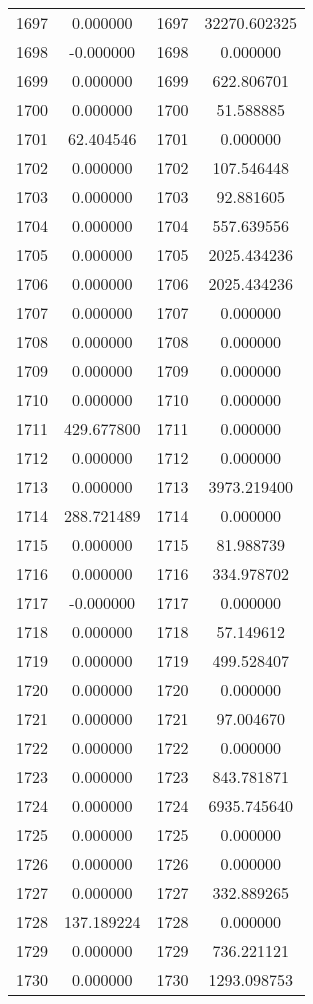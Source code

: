 \documentclass[12pt]{article}
\begin{document}
\begin{longtable}{@{}cccc@{}}
1697 & 0.000000 & 1697 & 32270.602325 \\
1698 & -0.000000 & 1698 & 0.000000 \\
1699 & 0.000000 & 1699 & 622.806701 \\
1700 & 0.000000 & 1700 & 51.588885 \\
1701 & 62.404546 & 1701 & 0.000000 \\
1702 & 0.000000 & 1702 & 107.546448 \\
1703 & 0.000000 & 1703 & 92.881605 \\
1704 & 0.000000 & 1704 & 557.639556 \\
1705 & 0.000000 & 1705 & 2025.434236 \\
1706 & 0.000000 & 1706 & 2025.434236 \\
1707 & 0.000000 & 1707 & 0.000000 \\
1708 & 0.000000 & 1708 & 0.000000 \\
1709 & 0.000000 & 1709 & 0.000000 \\
1710 & 0.000000 & 1710 & 0.000000 \\
1711 & 429.677800 & 1711 & 0.000000 \\
1712 & 0.000000 & 1712 & 0.000000 \\
1713 & 0.000000 & 1713 & 3973.219400 \\
1714 & 288.721489 & 1714 & 0.000000 \\
1715 & 0.000000 & 1715 & 81.988739 \\
1716 & 0.000000 & 1716 & 334.978702 \\
1717 & -0.000000 & 1717 & 0.000000 \\
1718 & 0.000000 & 1718 & 57.149612 \\
1719 & 0.000000 & 1719 & 499.528407 \\
1720 & 0.000000 & 1720 & 0.000000 \\
1721 & 0.000000 & 1721 & 97.004670 \\
1722 & 0.000000 & 1722 & 0.000000 \\
1723 & 0.000000 & 1723 & 843.781871 \\
1724 & 0.000000 & 1724 & 6935.745640 \\
1725 & 0.000000 & 1725 & 0.000000 \\
1726 & 0.000000 & 1726 & 0.000000 \\
1727 & 0.000000 & 1727 & 332.889265 \\
1728 & 137.189224 & 1728 & 0.000000 \\
1729 & 0.000000 & 1729 & 736.221121 \\
1730 & 0.000000 & 1730 & 1293.098753 \\

\end{longtable}
\end{document}
